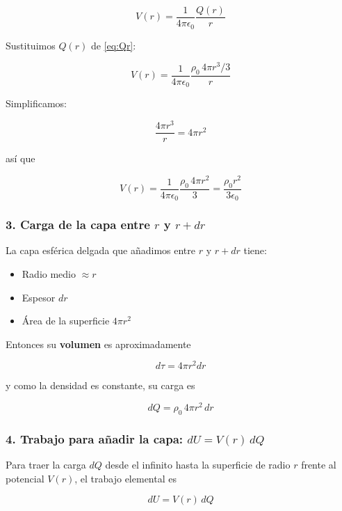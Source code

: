 \documentclass{article}
\begin{document}
\begin{equation}
V(r) = \frac{1}{4\pi\epsilon_{0}}\frac{Q(r)}{r}
\label{eq:V-r-def}
\end{equation}

Sustituimos $Q(r)$ de \eqref{eq:Qr}:

\[
V(r) = \frac{1}{4\pi\epsilon_{0}}\frac{\rho_{0}\,4\pi r^{3}/3}{r}
\]

Simplificamos:

\[
\frac{4\pi r^{3}}{r} = 4\pi r^{2}
\]

así que

\begin{equation}
V(r) = \frac{1}{4\pi\epsilon_{0}}\frac{\rho_{0}\,4\pi r^{2}}{3}
= \frac{\rho_{0}r^{2}}{3\epsilon_{0}}
\label{eq:V-r}
\end{equation}

\subsubsection*{3. Carga de la capa entre $r$ y $r+dr$}

La capa esférica delgada que añadimos entre $r$ y $r+dr$ tiene:

\begin{itemize}
  \item Radio medio $\approx r$
  \item Espesor $dr$
  \item Área de la superficie $4\pi r^{2}$
\end{itemize}

Entonces su \textbf{volumen} es aproximadamente

\[
d\tau = 4\pi r^{2} dr
\]

y como la densidad es constante, su carga es

\begin{equation}
dQ = \rho_{0}\,4\pi r^{2}\,dr
\label{eq:dQ}
\end{equation}

\subsubsection*{4. Trabajo para añadir la capa: $dU = V(r)\,dQ$}

Para traer la carga $dQ$ desde el infinito hasta la superficie de radio $r$ frente al potencial $V(r)$, el trabajo elemental es

\begin{equation}
dU = V(r)\,dQ
\label{eq:dU-def}
\end{equation}
\end{document}

